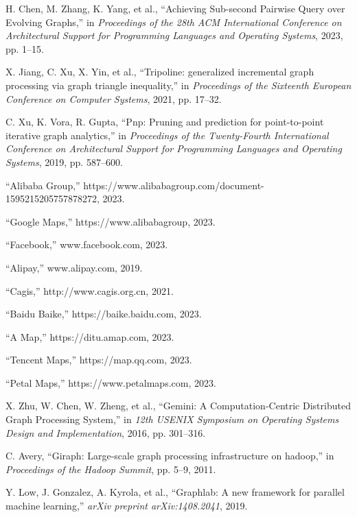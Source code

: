 \documentclass[lettersize,journal]{IEEEtran} %
\begin{document}
\begin{thebibliography}{100}
  
  
  H. Chen, M. Zhang, K. Yang, et al., ``Achieving Sub-second Pairwise Query over Evolving Graphs,'' in \textit{Proceedings of the 28th ACM International Conference on Architectural Support for Programming Languages and Operating Systems}, 2023, pp. 1--15.
  
  X. Jiang, C. Xu, X. Yin, et al., ``Tripoline: generalized incremental graph processing via graph triangle inequality,'' in \textit{Proceedings of the Sixteenth European Conference on Computer Systems}, 2021, pp. 17--32.
  
  C. Xu, K. Vora, R. Gupta, ``Pnp: Pruning and prediction for point-to-point iterative graph analytics,'' in \textit{Proceedings of the Twenty-Fourth International Conference on Architectural Support for Programming Languages and Operating Systems}, 2019, pp. 587--600.
  
  ``Alibaba Group,'' https://www.alibabagroup.com/document-1595215205757878272, 2023.
  
  
  ``Google Maps,'' https://www.alibabagroup, 2023.
  
  ``Facebook,'' www.facebook.com, 2023.
  
  ``Alipay,'' www.alipay.com, 2019.
  
  ``Cagis,'' http://www.cagis.org.cn, 2021.
  
  ``Baidu Baike,'' https://baike.baidu.com, 2023.
  
  ``A Map,'' https://ditu.amap.com, 2023.
  
  ``Tencent Maps,'' https://map.qq.com, 2023.
  
  ``Petal Maps,'' https://www.petalmaps.com, 2023.
  
  X. Zhu, W. Chen, W. Zheng, et al., ``Gemini: A {Computation-Centric} Distributed Graph Processing System,'' in \textit{12th USENIX Symposium on Operating Systems Design and Implementation}, 2016, pp. 301--316.
  
  C. Avery, ``Giraph: Large-scale graph processing infrastructure on hadoop,'' in \textit{Proceedings of the Hadoop Summit}, pp. 5--9, 2011.
  
  Y. Low, J. Gonzalez, A. Kyrola, et al., ``Graphlab: A new framework for parallel machine learning,'' \textit{arXiv preprint arXiv:1408.2041}, 2019.
  

\end{thebibliography}
\end{document}
